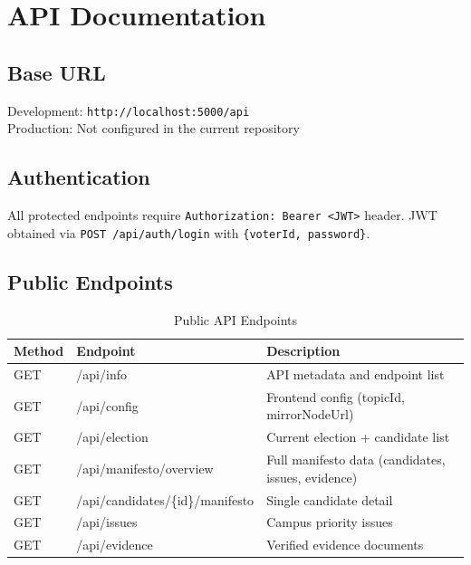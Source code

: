 \chapter{API Documentation}
\label{app:api}

\section{Base URL}
\label{sec:base-url}
Development: \texttt{http://localhost:5000/api} \\
Production: Not configured in the current repository

\section{Authentication}
\label{sec:api-auth}
All protected endpoints require \texttt{Authorization: Bearer <JWT>} header.
JWT obtained via \texttt{POST /api/auth/login} with \texttt{\{voterId, password\}}.

\section{Public Endpoints}
\label{sec:public-endpoints}

\begin{table}[H]
\centering
\caption{Public API Endpoints}
\label{tab:public-api}
\begin{tabular}{@{}lll@{}}
\toprule
\textbf{Method} & \textbf{Endpoint} & \textbf{Description} \\
\midrule
GET & /api/info & API metadata and endpoint list \\
GET & /api/config & Frontend config (topicId, mirrorNodeUrl) \\
GET & /api/election & Current election + candidate list \\
GET & /api/manifesto/overview & Full manifesto data (candidates, issues, evidence) \\
GET & /api/candidates/\{id\}/manifesto & Single candidate detail \\
GET & /api/issues & Campus priority issues \\
GET & /api/evidence & Verified evidence documents \\
\midrule
\end{tabular}
\end{table}

